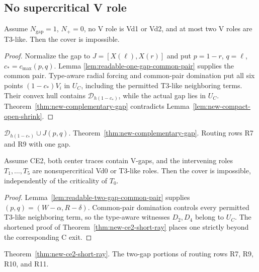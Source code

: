 \subsection{No supercritical V role}

\begin{proposition}
\label{prop:readable-nplus-zero-one-gap}
Assume $N_{\mathrm{gap}}=1$, $N_+=0$, no V role is Vd1 or Vd2, and at most
two V roles are T3-like.  Then the cover is impossible.
\end{proposition}

\begin{proof}
Normalize the gap to $J=[X(\ell),X(r)]$ and put
$p=1-r$, $q=\ell$, $c_*=c_{\max}(p,q)$.  Lemma
\ref{lem:readable-one-gap-common-pair} supplies the common pair.  Type-aware
radial forcing and common-pair domination put all six points
$(1-c_*)V_i$ in $U_C$, including the permitted T3-like neighboring terms.
Their convex hull contains $\mathcal D_{h(1-c_*)}$, while the actual gap lies
in $U_C$.  Theorem~\ref{thm:new-complementary-gap} contradicts
Lemma~\ref{lem:new-compact-open-shrink}.
\end{proof}

{$\mathcal D_{h(1-c_*)}\cup J(p,q)$.}
{Theorem~\ref{thm:new-complementary-gap}.}
{Routing rows R7 and R9 with one gap.}

\begin{proposition}
\label{prop:readable-two-gap-common-closure}
Assume CE2, both center traces contain V-gaps, and the intervening roles
$T_1,\ldots,T_5$ are nonsupercritical Vd0 or T3-like roles.  Then the cover
is impossible, independently of the criticality of $T_0$.
\end{proposition}

\begin{proof}
Lemma~\ref{lem:readable-two-gap-common-pair} supplies
$(p,q)=(W-\alpha,R-\delta)$.  Common-pair domination controls every
permitted T3-like neighboring term, so the type-aware witnesses $D_2,D_4$
belong to $U_C$.  The shortened proof of
Theorem~\ref{thm:new-ce2-short-ray} places one strictly beyond the
corresponding C exit.
\end{proof}

{Theorem~\ref{thm:new-ce2-short-ray}.}
{The two-gap portions of routing rows R7, R9, R10, and R11.}

